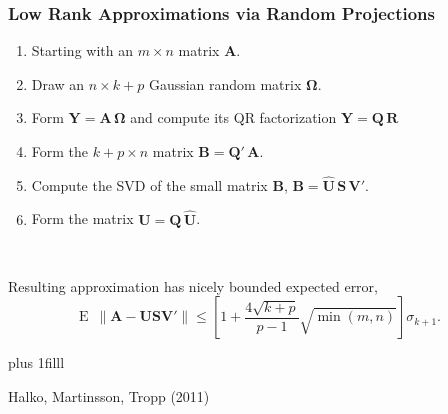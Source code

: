 \documentclass[t]{beamer}\usepackage[]{graphicx}\usepackage[]{color}
\newcommand{\vvfill}{\vskip0pt plus 1filll}
\begin{document}
\begin{frame}
\frametitle{Low Rank Approximations via Random Projections}

\begin{enumerate}
\item Starting with an $m \times n$ matrix $\bm{A}$.
\item Draw an $n \times k+p$ Gaussian random matrix $\bm{\Omega}$.
\item Form $\bm{Y} = \bm{A}\,\bm{\Omega}$ and compute its QR factorization $\bm{Y} = \bm{Q}\,\bm{R}$
\item Form the $k+p \times n$ matrix $\bm{B}=\bm{Q}'\,\bm{A}$.
\item Compute the SVD of the small matrix $\bm{B}$, $\bm{B} = \bm{\hat{U}}\,\bm{S}\,\bm{V}'$.
\item Form the matrix $\bm{U} = \bm{Q} \, \bm{\hat{U}}$.
\end{enumerate}

~\\ \pause

Resulting approximation has nicely bounded expected error,
%
\vspace{1mm}
\[ \text{E } \, \| \bm{A} - \bm{U}\bm{S}\bm{V}'\| \leq \left[1 + \frac{4\sqrt{k+p}}{p-1} \sqrt{\min(m,n)} \right] \sigma_{k+1}. \]

\vvfill

{\footnotesize
\begin{center}
Halko, Martinsson, Tropp (2011)
\end{center}
}
\end{frame}


\end{document}
